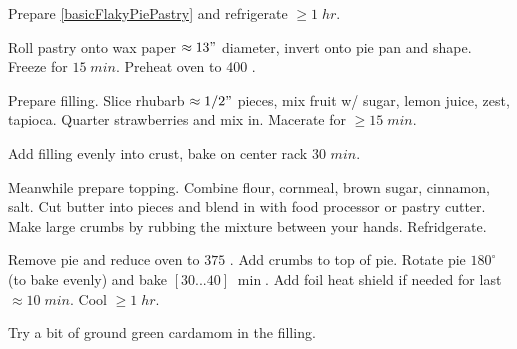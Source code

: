 \begin{preparation}
\item Prepare \ref{basicFlakyPiePastry}  and refrigerate $\geq 1\; hr$.

\item Roll pastry onto wax paper $\approx 13"$ diameter, invert onto pie pan and shape. Freeze for $15 \; min$. Preheat oven to $400$ \Fahrenheit.

\item Prepare filling. Slice rhubarb $\approx 1/2"$ pieces, mix fruit w/ sugar, lemon juice, zest, tapioca. Quarter strawberries and mix in. Macerate for $\geq 15 \; min$.

\item Add filling evenly into crust, bake on center rack $30$ $min$.

\item Meanwhile prepare topping. Combine flour, cornmeal, brown sugar, cinnamon, salt. Cut butter into pieces and blend in with food processor or pastry cutter. Make large crumbs by rubbing the mixture between your hands. Refridgerate.

\item Remove pie and reduce oven to $375$ \Fahrenheit. Add crumbs to top of pie. Rotate pie $180^\circ$ (to bake evenly) and bake $[30...40] \; \min$. Add foil heat shield if needed for last $\approx 10 \; min$. Cool $\geq 1\; hr$.
\end{preparation}


\begin{variation}
\item Try a bit of ground green cardamom in the filling.
\end{variation}

\recipeend
